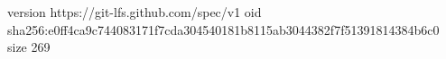 version https://git-lfs.github.com/spec/v1
oid sha256:e0ff4ca9c744083171f7cda304540181b8115ab3044382f7f51391814384b6c0
size 269

